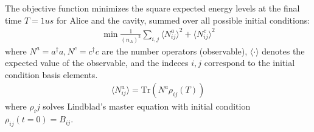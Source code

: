 \documentclass[letterpaper]{article}
\begin{document}
The objective function minimizes the square expected energy levels at the final time $T=1 us$ for Alice and the cavity, summed over all possible initial conditions:
\begin{align}
    \min \frac{1}{(n_A)^2} \sum_{i,j} \langle N^a_{ij} \rangle^2 + \langle N^c_{ij} \rangle^2
\end{align}
where $N^a = a^\dagger a, N^c = c^\dag c$ are the number operators (observable), $\langle \cdot \rangle$ denotes the expected value of the observable, and the indeces $i,j$ correspond to the initial condition basis elements. 
\begin{align}
    \langle N^a_{ij} \rangle = \mbox{Tr}\left( N^a \rho_{ij}(T) \right)
\end{align}
where $\rho_ij$ solves Lindblad's master equation with initial condition $\rho_{ij}(t=0) = B_{ij}$.
\end{document}

